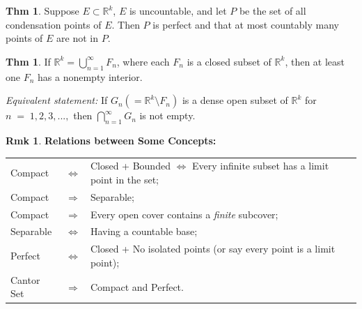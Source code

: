 \documentclass{article}
\theoremstyle{definition}
\newtheorem{theorem}[definition]{Thm}
\newtheorem{remarks}[definition]{Rmk}
\begin{document}
\begin{theorem}
    Suppose $E\subset \mathbb{R}^k$, $E$ is uncountable, and let $P$ be the set of all condensation points of $E$. Then $P$ is perfect and that at most countably many points of $E$ are not in $P$.
\end{theorem}
\begin{theorem}
    If $\mathbb{R}^k=\bigcup_{n=1}^\infty F_n$, where each $F_n$ is a closed subset of $\mathbb{R}^k$, then at least one $F_n$ has a nonempty interior.\par
    \textit{Equivalent statement:} If $G_n(=\mathbb{R}^k\setminus F_n)$ is a dense open subset of $\mathbb{R}^k$ for $n\;=\;1,2,3,...,$ then $\bigcap_{n=1}^\infty G_n$ is not empty.
\end{theorem}
\begin{remarks}
    \textbf{Relations between Some Concepts:}\par
    \begin{tabular}{@{}l@{\quad}l@{\quad}l@{}}
    Compact   & $\iff$             & Closed + Bounded $\iff$ Every infinite subset has a limit point in the set; \\
    Compact   & $\Longrightarrow$ & Separable; \\
    Compact   & $\Longrightarrow$ & Every open cover contains a \textit{finite} subcover;\\
    Separable & $\iff$             & Having a countable base; \\
    Perfect   & $\iff$             & Closed + No isolated points (or say every point is a limit point); \\
    Cantor Set& $\Longrightarrow$ & Compact and Perfect.
    \end{tabular}
\end{remarks}
\end{document}
